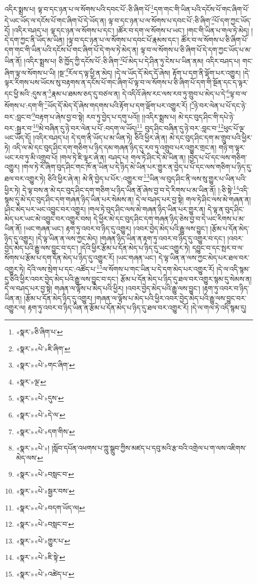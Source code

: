 འདིར་སྨྲས་པ། ལྟ་བ་དང་ཉན་པ་ལ་སོགས་པའི་དབང་པོ་:ཅི་ཞིག་པོ་\footnote{«སྣར་»ཅི་ཞིག་པ་}དག་གང་གི་ཡིན་པའི་དངོས་པོ་གང་ཞིག་པོ་དེ་ཡང་ཡོད་ལ་དངོས་པོ་གང་ཞིག་པོ་དེ་ཡོད་ན། ལྟ་བ་དང་ཉན་པ་ལ་སོགས་པ་དབང་པོ་:ཅི་ཞིག་\footnote{«སྣར་»«པེ་»ཇི་ཞིག་}པོ་དག་ཀྱང་ཡོད་དོ། །འདིར་བཤད་པ། ལྟ་དང་ཉན་ལ་སོགས་པ་དང་། །ཚོར་བ་དག་ལ་སོགས་པ་ཡང་། །གང་གི་ཡིན་པ་གལ་ཏེ་མེད། །དེ་དག་ཀྱང་ནི་ཡོད་མ་ཡིན། །ལྟ་བ་དང་ཉན་པ་ལ་སོགས་པ་དབང་པོ་རྣམས་དང་། ཚོར་བ་ལ་སོགས་པ་ཅི་ཞིག་པོ་དག་གང་གི་ཡིན་པའི་དངོས་པོ་གང་ཞིག་པོ་དེ་གལ་ཏེ་མེད་ན། ལྟ་བ་ལ་སོགས་པ་ཅི་ཞིག་པོ་དེ་དག་ཀྱང་ཡོད་པ་མ་ཡིན་ནོ། །འདིར་སྨྲས་པ། ཅི་ཁྱོད་ཀྱི་དངོས་པོ་:ཅི་ཞིག་\footnote{«སྣར་»«པེ་»གང་ཞིག་}པོ་མེད་པ་དེ་ཤིན་ཏུ་ངེས་པ་ཡིན་ནམ། འདིར་བཤད་པ། གང་ཞིག་ལྟ་ལ་སོགས་པ་ཡི། །སྔ་\footnote{«སྣར་»ལྔ་}རོལ་ད་ལྟ་ཕྱི་ན་མེད། །དེ་ལ་ཡོད་དོ་མེད་དོ་ཞེས། རྟོག་པ་དག་ནི་ལྡོག་པར་འགྱུར། །དེ་ལྟར་རིགས་པས་ཡོངས་སུ་བརྟགས་ན་དངོས་པོ་གང་ཞིག་པོ་ལྟ་བ་ལ་སོགས་པ་ཅི་ཞིག་པོ་དག་གི་སྔོན་དང་ད་ལྟར་དང་ཕྱི་མའི་:དུས་ན་\footnote{«སྣར་»«པེ་»དུས་}རྣམ་པ་ཐམས་ཅད་དུ་བཙལ་ན། དེ་འདིའོ་ཞེས་རང་ལས་རབ་ཏུ་གྲུབ་པ་མེད་པ་དེ་\footnote{«སྣར་»«པེ་»དེ་ལ་}ལྟ་བ་ལ་སོགས་པ་:དག་གི་\footnote{«སྣར་»«པེ་»དག་གིས་}ཡོད་དོ་མེད་དོ་ཞེས་གདགས་པའི་རྟོག་པ་དག་ལྡོག་པར་འགྱུར་རོ། །\footnote{«སྣར་»«པེ་»། །སློབ་དཔོན་འཕགས་པ་ཀླུ་སྒྲུབ་ཀྱིས་མཛད་པ་དབུ་མའི་རྩ་བའི་འགྲེལ་པ་ག་ལས་འཇིགས་མེད་ལས་}ཉེ་བར་ལེན་པ་པོ་དང་ཉེ་བར་:བླང་བ་\footnote{«སྣར་»«པེ་»བསླང་བ་}བརྟག་པ་ཞེས་བྱ་བ་སྟེ། རབ་ཏུ་བྱེད་པ་དགུ་པའོ།། །།འདིར་སྨྲས་པ། མེ་དང་བུད་ཤིང་གི་དཔེ་ཉེ་བར་:སྦྱར་བ་\footnote{«སྣར་»«པེ་»སྦྱར་བས་}མེ་བཞིན་དུ་ཉེ་བར་ལེན་པ་པོ་:བདག་ལ་ཡོད།\footnote{«སྣར་»«པེ་»བདག་ཡོད་ལ།} བུད་ཤིང་བཞིན་དུ་ཉེ་བར་:བླང་བ་\footnote{«སྣར་»«པེ་»བསླང་བ་}ཕུང་པོ་ལྔ་ཡང་ཡོད་དོ། །འདིར་བཤད་པ། དེ་དག་ནི་ཡོད་པ་མ་ཡིན་ཏེ། ཅིའི་ཕྱིར་ཞེ་ན། མེ་དང་བུད་ཤིང་དག་མ་གྲུབ་པའི་ཕྱིར་ཏེ། འདི་ལ་མེ་དང་བུད་ཤིང་དག་གཅིག་པ་ཉིད་དམ་གཞན་ཉིད་དུ་རབ་ཏུ་འགྲུབ་པར་འགྱུར་གྲང་ན། གཉི་ག་ལྟར་ཡང་རབ་ཏུ་མི་འགྲུབ་པོ། །གལ་ཏེ་ཇི་ལྟར་ཞེ་ན། བཤད་པ། གལ་ཏེ་ཤིང་དེ་མེ་ཡིན་ན། །བྱེད་པ་པོ་དང་ལས་གཅིག་འགྱུར། །གལ་ཏེ་རེ་ཞིག་བུད་ཤིང་གང་ཁོ་ན་ཡིན་པ་དེ་ཉིད་མེ་ཡིན་པར་གྱུར་ན་བྱེད་པ་པོ་དང་ལས་གཅིག་པ་ཉིད་དུ་ཐལ་བར་འགྱུར་ཏེ། ཅིའི་ཕྱིར་ཞེ་ན། མེ་ནི་བྱེད་པ་པོར་:འགྱུར་བ་\footnote{«སྣར་»«པེ་»གྱུར་པ་}ཡིན་ལ་བུད་ཤིང་ནི་ལས་སུ་གྱུར་པ་ཡིན་པའི་ཕྱིར་ཏེ། དེ་ལྟ་བས་ན་མེ་དང་བུད་ཤིང་དག་གཅིག་པ་ཉིད་ཡིན་ནོ་ཞེས་བྱ་བ་དེ་རིགས་པ་མ་ཡིན་ནོ། །:ཅི་སྟེ་\footnote{«སྣར་»«པེ་»ཇི་སྟེ་}འདི་སྙམ་དུ་མེ་དང་བུད་ཤིང་དག་གཞན་ཉིད་ཡིན་པར་སེམས་ན། དེ་ལ་བཤད་པར་བྱ་སྟེ། གལ་ཏེ་ཤིང་ལས་མེ་གཞན་ན། །ཤིང་མེད་པར་ཡང་འབྱུང་བར་འགྱུར། །གལ་ཏེ་བུད་ཤིང་ལས་མེ་གཞན་ཉིད་ཡིན་པར་གྱུར་ན། དེ་ལྟ་ན་བུད་ཤིང་མེད་པར་ཡང་མེ་འབྱུང་བར་འགྱུར་བས། དེ་ཕྱིར་མེ་དང་བུད་ཤིང་དག་གཞན་ཉིད་ཅེས་བྱ་བ་དེ་ཡང་རིགས་པ་མ་ཡིན་ནོ། །ཡང་གཞན་ཡང་། རྟག་ཏུ་འབར་བ་ཉིད་དུ་འགྱུར། །འབར་བྱེད་མེད་པའི་རྒྱུ་ལས་བྱུང་། །རྩོམ་པ་དོན་མེད་ཉིད་དུ་འགྱུར། །དེ་ལྟ་ཡིན་ན་ལས་ཀྱང་མེད། །གཞན་ཉིད་ཡིན་ན་རྟག་ཏུ་འབར་བ་ཉིད་དུ་འགྱུར་བ་དང་། །འབར་བྱེད་མེད་པའི་རྒྱུ་ལས་བྱུང་བ་དང་། །དེའི་ཕྱིར་རྩོམ་པ་དོན་མེད་པ་ཉིད་དུ་ཡང་འགྱུར་ཏེ། དབྱུང་བ་དང་སྤར་བ་ལ་སོགས་པ་རྩོམ་པ་དག་དོན་མེད་པ་ཉིད་དུ་འགྱུར་རོ། །ཡང་གཞན་ཡང་། དེ་ལྟ་ཡིན་ན་ལས་ཀྱང་མེད་པར་ཐལ་བར་འགྱུར་ཏེ། དེའི་ལས་སྲེག་པ་དང་:འཚོད་པ་\footnote{«སྣར་»«པེ་»འཚེད་པ་}ལ་སོགས་པ་གང་ཡིན་པ་དེ་དག་མེད་པར་འགྱུར་རོ། །དེ་ལ་འདི་སྙམ་དུ་ཅིའི་ཕྱིར་འབར་བྱེད་མེད་པའི་རྒྱུ་ལས་བྱུང་བ་དང་། རྩོམ་པ་དོན་མེད་པ་ཉིད་དུ་ཐལ་བར་འགྱུར་སྙམ་དུ་སེམས་ན། དེ་ལ་བཤད་པར་བྱ་སྟེ། གཞན་ལ་ལྟོས་པ་མེད་པའི་ཕྱིར། །འབར་བྱེད་མེད་པའི་རྒྱུ་ལས་བྱུང་། །རྟག་ཏུ་འབར་བ་ཉིད་ཡིན་ན། །རྩོམ་པ་དོན་མེད་ཉིད་དུ་འགྱུར། །གཞན་ལ་ལྟོས་པ་མེད་པའི་ཕྱིར་འབར་བྱེད་མེད་པའི་རྒྱུ་ལས་བྱུང་བར་འགྱུར་ལ། རྟག་ཏུ་འབར་བ་ཉིད་ཡིན་ན་རྩོམ་པ་དོན་མེད་པ་ཉིད་དུ་ཐལ་བར་འགྱུར་རོ། །དེ་ལ་གལ་ཏེ་འདི་སྙམ་དུ། 